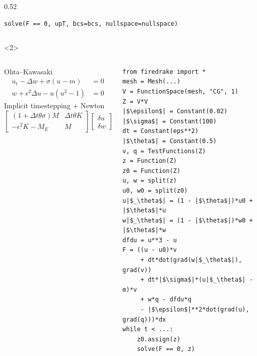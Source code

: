 \documentclass[presentation,aspectratio=43]{beamer}
\begin{document}
\begin{frame}[fragile,t]
\begin{onlyenv}
\begin{columns}[t]
\begin{column}{0.52\framewidth}
\begin{verbatim}
solve(F == 0, upT, bcs=bcs, nullspace=nullspace)
\end{verbatim}
      \end{column}
    \end{columns}
  \end{onlyenv}
  \begin{onlyenv}<2>
    \begin{columns}[t]
      \begin{column}{0.47\textwidth}
        \begin{block}{Ohta--Kawasaki}
          \small
          \begin{align*}
            u_t - \Delta w + \sigma(u - m) &= 0\\
            w + \epsilon^2 \Delta u - u(u^2 - 1) &= 0
          \end{align*}
          Implicit timestepping + Newton
          \begin{equation*}
            \begin{bmatrix}
              (1 + \Delta t \theta \sigma)M  & \Delta t\theta K \\
              -\epsilon^2 K - M_E & M
            \end{bmatrix}
            \begin{bmatrix}
              \delta u \\
              \delta w
            \end{bmatrix} =
            \begin{bmatrix}
              f_1 \\
              f_2
            \end{bmatrix}
          \end{equation*}
        \end{block}
      \end{column}
      \begin{column}{0.52\textwidth}
\begin{verbatim}
from firedrake import *
mesh = Mesh(...)
V = FunctionSpace(mesh, "CG", 1)
Z = V*V
|$\epsilon$| = Constant(0.02)
|$\sigma$| = Constant(100)
dt = Constant(eps**2)
|$\theta$| = Constant(0.5)
v, q = TestFunctions(Z)
z = Function(Z)
z0 = Function(Z)
u, w = split(z)
u0, w0 = split(z0)
u|$_\theta$| = (1 - |$\theta$|)*u0 + |$\theta$|*u
w|$_\theta$| = (1 - |$\theta$|)*w0 + |$\theta$|*w
dfdu = u**3 - u
F = ((u - u0)*v
     + dt*dot(grad(w|$_\theta$|), grad(v))
     + dt*|$\sigma$|*(u|$_\theta$| - m)*v
     + w*q - dfdu*q
     - |$\epsilon$|**2*dot(grad(u), grad(q)))*dx
while t < ...:
    z0.assign(z)
    solve(F == 0, z)
\end{verbatim}
      \end{column}
    \end{columns}
  \end{onlyenv}
\end{frame}
\end{document}
